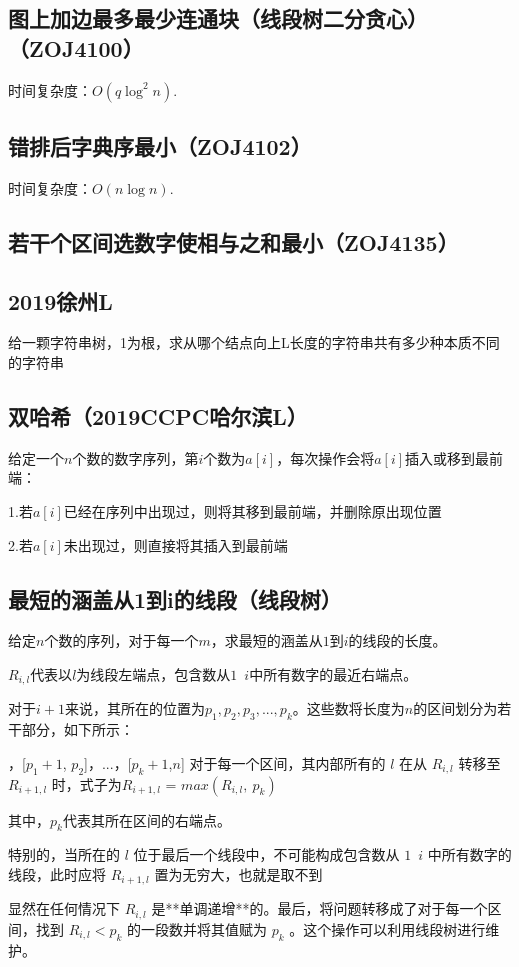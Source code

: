 \documentclass[twoside,a4paper]{article}
\begin{document}
\subsection{图上加边最多最少连通块（线段树二分贪心）（ZOJ4100）}
时间复杂度：$O(q \log ^ {2} n)$.


\subsection{错排后字典序最小（ZOJ4102）}
时间复杂度：$O(n \log n)$.


\subsection{若干个区间选数字使相与之和最小（ZOJ4135）}


\subsection{2019徐州L}
给一颗字符串树，1为根，求从哪个结点向上L长度的字符串共有多少种本质不同的字符串


\subsection{双哈希（2019CCPC哈尔滨L）}
给定一个$n$个数的数字序列，第$i$个数为$a[i]$，每次操作会将$a[i]$插入或移到最前端：\par
1.若$a[i]$已经在序列中出现过，则将其移到最前端，并删除原出现位置\par
2.若$a[i]$未出现过，则直接将其插入到最前端\par



\subsection{最短的涵盖从1到i的线段（线段树）}
给定$n$个数的序列，对于每一个$m$，求最短的涵盖从$1$到$i$的线段的长度。\par
$R_{i,l}$代表以$l$为线段左端点，包含数从$1$~$i$中所有数字的最近右端点。\par
对于$i+1$来说，其所在的位置为$p_{1},p_{2},p_{3},...,p_{k}$。这些数将长度为$n$的区间划分为若干部分，如下所示：\par
[1, $p_{1}$]，[$p_{1}+1$, $p_{2}$]，...，[$p_{k}+1$,$n$]
对于每一个区间，其内部所有的 $l$ 在从 $R_{i,l}$ 转移至 $R_{i+1,l}$ 时，式子为$R_{i+1,l}$ = $max(R_{i,l}, \ p_{k})$\par
其中，$p_{k}$代表其所在区间的右端点。\par
特别的，当所在的 $l$ 位于最后一个线段中，不可能构成包含数从 $1$~$i$ 中所有数字的线段，此时应将 $R_{i+1,l}$ 置为无穷大，也就是取不到\par
显然在任何情况下 $R_{i,l}$ 是**单调递增**的。最后，将问题转移成了对于每一个区间，找到 $R_{i,l} < p_{k}$ 的一段数并将其值赋为 $p_{k}$ 。这个操作可以利用线段树进行维护。

\end{document}
